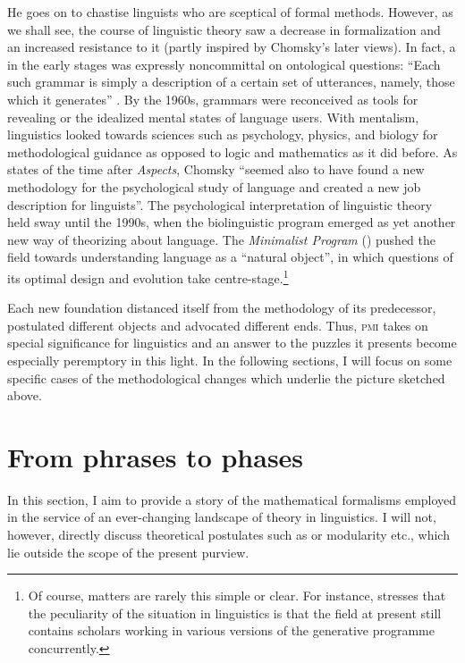 \documentclass[output=paper]{langscibook}
\begin{document}
He goes on to chastise linguists who are sceptical of formal methods. However, as we shall see, the course of linguistic theory saw a decrease in formalization and an increased resistance to it (partly inspired by Chomsky's later views). In fact, a  in the early stages was expressly noncommittal on ontological questions: ``Each such grammar is simply a description of a certain set of utterances, namely, those which it generates'' \citep[48]{Chomsky1957}. By the 1960s, grammars were reconceived as tools for revealing  or the idealized mental states of language users. With mentalism, linguistics looked towards sciences such as psychology, physics, and biology for methodological guidance as opposed to logic and mathematics as it did before. As \cite[167]{Cowie1999} states of the time after \emph{Aspects}, Chomsky ``seemed also to have found a new methodology for the psychological study of language and created a new job description for linguists''. The psychological interpretation of linguistic theory held sway until the 1990s, when the biolinguistic program emerged as yet another new way of theorizing about language. The \emph{Minimalist Program} (\citeyear{Chomsky1995MP}) pushed the field towards understanding language as a ``natural object'', in which questions of its optimal design and evolution take centre-stage.\footnote{Of course, matters are rarely this simple or clear. For instance, \cite{Bickerton2014} stresses that the peculiarity of the situation in linguistics is that the field at present still contains scholars working in various versions of the generative programme concurrently.}

Each new foundation distanced itself from the methodology of its predecessor, postulated different objects and advocated different ends. Thus, \textsc{pmi} takes on special significance for linguistics and an answer to the puzzles it presents become especially peremptory in this light. In the following sections, I will focus on some specific cases of the methodological changes which underlie the picture sketched above. 


\section{From phrases to phases}
\label{sec:nefdt:phrasephase}

In this section, I aim to provide a story of the mathematical formalisms employed in the service of an ever-changing landscape of theory in linguistics. I will not, however, directly discuss theoretical postulates such as  or modularity etc., which lie outside the scope of the present purview.
\end{document}
